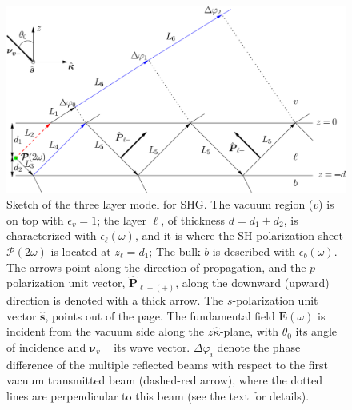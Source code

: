 \begin{figure}
\centering 
\includegraphics[scale=.5]{content/figures/diag-3layer_MR_2w}
\caption{Sketch of the three layer model for SHG. The vacuum region ($v$) is on
top with $\epsilon_{v}=1$; the layer $\ell$, of thickness $d = d_{1} + d_{2}$,
is characterized with $\epsilon_{\ell}(\omega)$, and it is where the SH
polarization sheet $\boldsymbol{\mathcal{P}}(2\omega)$ is located at $z_{\ell} =
d_{1}$; The bulk $b$ is described with $\epsilon_{b}(\omega)$. The arrows point
along the direction of propagation, and the $p$-polarization unit vector,
$\hat{\mathbf{P}}_{\ell -(+)}$, along the downward (upward) direction is denoted
with a thick arrow. The $s$-polarization unit vector $\hat{\mathbf{s}}$, points
out of the page. The fundamental field $\mathbf{E}(\omega)$ is incident from the
vacuum side along the $z\hat{\boldsymbol{\kappa}}$-plane, with $\theta_{0}$ its
angle of incidence and $\boldsymbol{\nu}_{v-}$ its wave vector.
$\Delta\varphi_{i}$ denote the phase difference of the multiple reflected beams
with respect to the first vacuum transmitted beam (dashed-red arrow), where the
dotted lines are perpendicular to this beam (see the text for details).}
\label{fig:MR3layer2w}
\end{figure}

